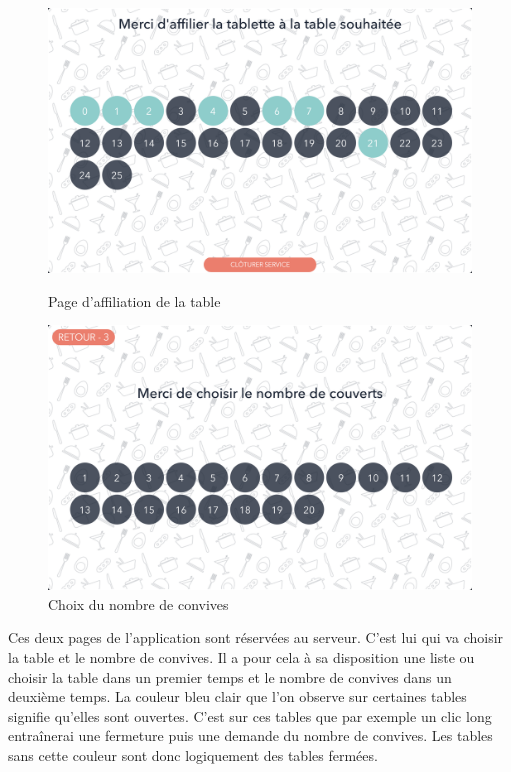 \begin{figure}[!htb]
  \centering
  \begin{minipage}[b]{0.45\textwidth}
    \includegraphics[width=\textwidth]{images/affiliation_table.png}
    \caption{Page d'affiliation de la table}
  \end{minipage}
  \hfill
  \begin{minipage}[b]{0.45\textwidth}
    \includegraphics[width=\textwidth]{images/affiliation_convive.png}
    \caption{Choix du nombre de convives}
  \end{minipage}
\end{figure}

Ces deux pages de l'application sont réservées au serveur. C'est lui qui va choisir la table et le nombre de convives. Il a pour cela à sa disposition une liste ou choisir la table dans un premier temps et le nombre de convives dans un deuxième temps. La couleur bleu clair que l'on observe sur certaines tables signifie qu'elles sont ouvertes. C'est sur ces tables que par exemple un clic long entraînerai une fermeture puis une demande du nombre de convives. Les tables sans cette couleur sont donc logiquement des tables fermées.

